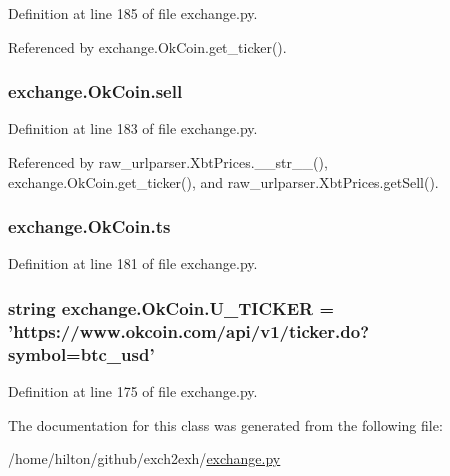Definition at line 185 of file exchange.\-py.



Referenced by exchange.\-Ok\-Coin.\-get\-\_\-ticker().

\hypertarget{classexchange_1_1_ok_coin_aadb487d2e2f277374a747e1bcb0bd40b}{
\subsubsection[{sell}]{\setlength{\rightskip}{0pt plus 5cm}exchange.\-Ok\-Coin.\-sell}}\label{classexchange_1_1_ok_coin_aadb487d2e2f277374a747e1bcb0bd40b}


Definition at line 183 of file exchange.\-py.



Referenced by raw\-\_\-urlparser.\-Xbt\-Prices.\-\_\-\-\_\-str\-\_\-\-\_\-(), exchange.\-Ok\-Coin.\-get\-\_\-ticker(), and raw\-\_\-urlparser.\-Xbt\-Prices.\-get\-Sell().

\hypertarget{classexchange_1_1_ok_coin_a0fe6263a7f58a6fa8a688929976b7e4a}{
\subsubsection[{ts}]{\setlength{\rightskip}{0pt plus 5cm}exchange.\-Ok\-Coin.\-ts}}\label{classexchange_1_1_ok_coin_a0fe6263a7f58a6fa8a688929976b7e4a}


Definition at line 181 of file exchange.\-py.

\hypertarget{classexchange_1_1_ok_coin_a81305ced2eb23b94feb7195d1d42afc2}{
\subsubsection[{U\-\_\-\-T\-I\-C\-K\-E\-R}]{\setlength{\rightskip}{0pt plus 5cm}string exchange.\-Ok\-Coin.\-U\-\_\-\-T\-I\-C\-K\-E\-R = 'https\-://www.\-okcoin.\-com/api/v1/ticker.\-do?symbol=btc\-\_\-usd'\hspace{0.3cm}{\ttfamily [static]}}}\label{classexchange_1_1_ok_coin_a81305ced2eb23b94feb7195d1d42afc2}


Definition at line 175 of file exchange.\-py.



The documentation for this class was generated from the following file\-:\begin{DoxyCompactItemize}
\item 
/home/hilton/github/exch2exh/\hyperlink{exchange_8py}{exchange.\-py}\end{DoxyCompactItemize}
